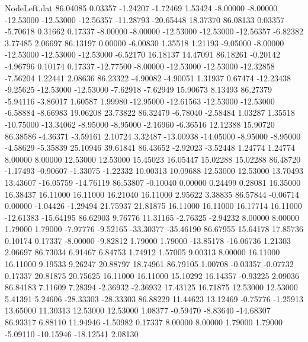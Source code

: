 \begin{filecontents}{NodeLeft.dat}
  86.04085    0.03357   -1.24207    -1.72469    1.53424   -8.00000   -8.00000  -12.53000  -12.53000  -12.56357  -11.28793  -20.65448   18.37370
  86.08133    0.03357   -5.70618     0.31662    0.17337   -8.00000   -8.00000  -12.53000  -12.53000  -12.56357   -6.82382    3.77485    2.06697
  86.13197    0.00000   -6.00830     1.35518    1.21193   -9.05000   -8.00000  -12.53000  -12.53000  -12.53000   -6.52170   16.18137   14.47091
  86.18261   -0.20142   -4.96796     0.10174    0.17337  -12.77500   -8.00000  -12.53000  -12.53000  -12.32858   -7.56204    1.22441    2.08636
  86.23322   -4.90082   -4.90051     1.31937    0.67474  -12.23438   -9.25625  -12.53000  -12.53000   -7.62918   -7.62949   15.90673    8.13493
  86.27379   -5.94116   -3.86017     1.60587    1.99980  -12.95000  -12.61563  -12.53000  -12.53000   -6.58884   -8.66983   19.06208   23.73822
  86.32479   -6.78040   -2.58484     1.03287    1.35518  -10.75000  -13.34062   -8.95000   -8.95000   -2.16960   -6.36516   12.12388   15.90720
  86.38586   -4.36371   -3.59161     2.10724    3.32487  -13.00938  -14.05000   -8.95000   -8.95000   -4.58629   -5.35839   25.10946   39.61841
  86.43652   -2.92023   -3.52448     1.24774    1.24774    8.00000    8.00000   12.53000   12.53000   15.45023   16.05447   15.02288   15.02288
  86.48720   -1.17493   -0.90607    -1.33075   -1.22332   10.00313   10.09688   12.53000   12.53000   13.70493   13.43607  -16.05759  -14.76119
  86.53807   -0.10040    0.00000     0.24499    0.28081   16.35000   16.38437   16.11000   16.11000   16.21040   16.11000    2.95622    3.38835
  86.57844   -0.06714    0.00000    -1.04426   -1.29494   21.75937   21.81875   16.11000   16.11000   16.17714   16.11000  -12.61383  -15.64195
  86.62903    9.76776   11.31165    -2.76325   -2.94232    8.00000    8.00000    1.79000    1.79000   -7.97776   -9.52165  -33.30377  -35.46190
  86.67955   15.64178   17.85736     0.10174    0.17337   -8.00000   -9.82812    1.79000    1.79000  -13.85178  -16.06736    1.21303    2.06697
  86.73034    6.91467    6.84753     1.74912    1.57005    9.00313    8.00000   16.11000   16.11000    9.19533    9.26247   20.88797   18.74961
  86.79105    1.00708   -0.03357    -0.07732    0.17337   20.81875   20.75625   16.11000   16.11000   15.10292   16.14357   -0.93225    2.09036
  86.84183    7.11609    7.28394    -2.36932   -2.36932   17.43125   16.71875   12.53000   12.53000    5.41391    5.24606  -28.33303  -28.33303
  86.88229   11.44623   13.12469    -0.75776   -1.25913   13.65000   11.30313   12.53000   12.53000    1.08377   -0.59470   -8.83640  -14.68307
  86.93317    6.88110   11.94946    -1.50982    0.17337    8.00000    8.00000    1.79000    1.79000   -5.09110  -10.15946  -18.12541    2.08130

\end{filecontents}

